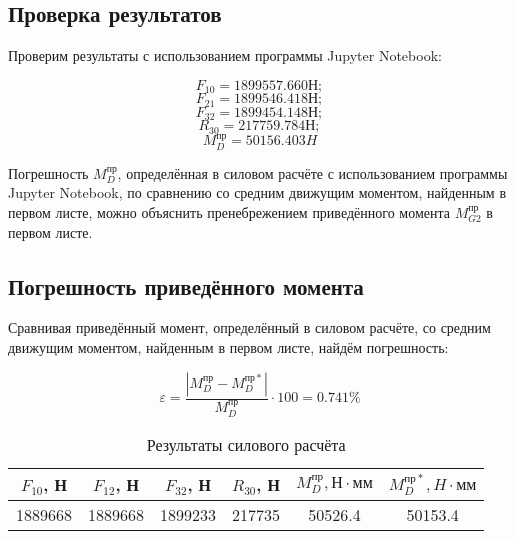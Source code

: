 \subsection{Проверка результатов}

Проверим результаты с использованием программы Jupyter Notebook:

	$$F_{10} = 1899557.660 Н;$$
	$$F_{21} = 1899546.418 Н;$$
	$$F_{32} = 1899454.148 Н;$$
	$$R_{30} = 217759.784 Н;$$
	$$M_D^{пр} = 50156.403 H$$

Погрешность $M_D^{пр}$, определённая в силовом расчёте с использованием программы Jupyter Notebook, по сравнению со средним движущим моментом, найденным в первом листе, можно объяснить пренебрежением приведённого момента $M_{G2}^{пр}$ в первом листе.

\subsection{Погрешность приведённого момента}

Сравнивая приведённый момент, определённый в силовом расчёте, со средним движущим моментом, найденным в первом листе, найдём погрешность:

 \begin{equation}
 	\varepsilon = \dfrac{ \left| M_D^{пр} - M_D^{пр*} \right| }{M_D^{пр}} \cdot 100 = 0.741 \%
 \end{equation}
 
 \begin{table}
 	\caption{Результаты силового расчёта}
 \begin{tabular}{|c|c|c|c|c|c|}
 	\hline 
 	$F_{10}$, Н & $F_{12}$, Н & $F_{32}$, Н & $R_{30}$, Н &  $M_D^{пр},Н \cdot мм$ & $M_D^{пр*}, H \cdot мм$ \\ 
 	\hline 
 	1889668 & 1889668 & 1899233 & 217735 & 50526.4 & 50153.4 \\ 
 	\hline 
 \end{tabular} 
\end{table}